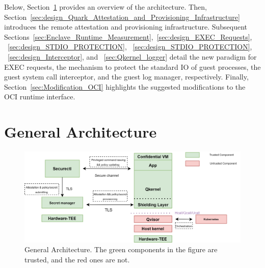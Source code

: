 Below, Section~\ref{sec:General_Architecture} provides an overview of the architecture. Then, Section~\ref{sec:design_Quark_Attestation_and_Provisioning_Infrastructure} introduces the remote attestation and provisioning infrastructure. Subsequent Sections~\ref{sec:Enclave_Runtime_Measurement},~\ref{sec:design_EXEC_Requests},
~\ref{sec:design_STDIO_PROTECTION}, ~\ref{sec:design_STDIO_PROTECTION}, ~\ref{sec:design_Interceptor}, and ~\ref{sec:Qkernel_logger} detail the new paradigm for EXEC requests, the mechanism to protect the standard IO of guest processes, the guest system call interceptor, and the guest log manager, respectively. 
Finally, Section~\ref{sec:Modification_OCI} highlights the suggested modifications to the OCI runtime interface.



\section{General Architecture}
\label{sec:General_Architecture}
\begin{figure}[!htb]
    \centering
    \includegraphics[height=0.3\textheight, width=1\textwidth]{images/genaral_architechture.png}
    \caption[General Architecture]{General Architecture. The green components in the figure are trusted, and the red ones are not.}
    \label{fig:genaral_architechture}
\end{figure}

